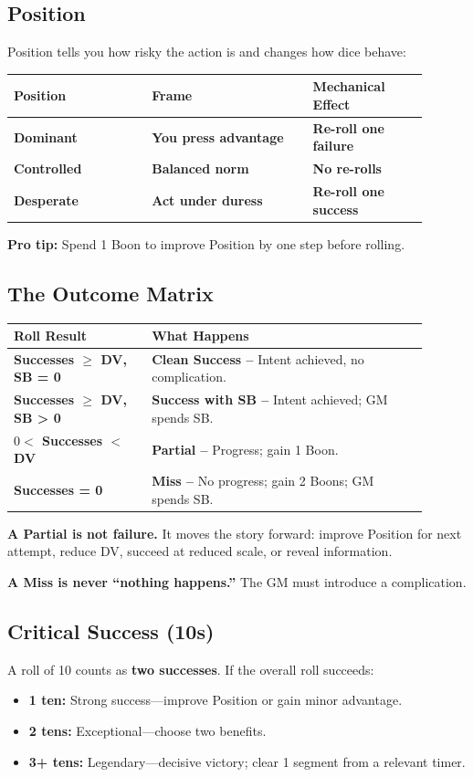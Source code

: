 \documentclass[10pt,twocolumn]{article} %
\begin{document}
\subsection{Position}
Position tells you how risky the action is and changes how dice behave:
\begin{coretable}
\begin{tabular}{>{\bfseries}p{0.3\linewidth} >{\bfseries}p{0.35\linewidth} >{\bfseries}p{0.25\linewidth}}
\toprule
\textbf{Position} & \textbf{Frame} & \textbf{Mechanical Effect} \\
\midrule
Dominant & You press advantage & Re-roll one failure \\
Controlled & Balanced norm & No re-rolls \\
Desperate & Act under duress & Re-roll one success \\
\bottomrule
\end{tabular}
\end{coretable}
\textbf{Pro tip:} Spend 1 Boon to improve Position by one step before rolling.

\subsection{The Outcome Matrix}
\begin{coretable}
\begin{tabular}{>{\bfseries}p{0.3\linewidth} p{0.6\linewidth}}
\toprule
\textbf{Roll Result} & \textbf{What Happens} \\
\midrule
Successes $\ge$ DV, SB = 0 & \textbf{Clean Success –} Intent achieved, no complication. \\
Successes $\ge$ DV, SB > 0 & \textbf{Success with SB –} Intent achieved; GM spends SB. \\
$0 <$ Successes $<$ DV & \textbf{Partial –} Progress; gain 1 Boon. \\
Successes = 0 & \textbf{Miss –} No progress; gain 2 Boons; GM spends SB. \\
\bottomrule
\end{tabular}
\end{coretable}

\textbf{A Partial is not failure.} It moves the story forward: improve Position for next attempt, reduce DV, succeed at reduced scale, or reveal information.

\textbf{A Miss is never ``nothing happens.''} The GM must introduce a complication.

\subsection{Critical Success (10s)}
A roll of 10 counts as \textbf{two successes}. If the overall roll succeeds:
\begin{itemize}
    \item \textbf{1 ten:} Strong success—improve Position or gain minor advantage.
    \item \textbf{2 tens:} Exceptional—choose two benefits.
    \item \textbf{3+ tens:} Legendary—decisive victory; clear 1 segment from a relevant timer.
\end{itemize}
\end{document}

